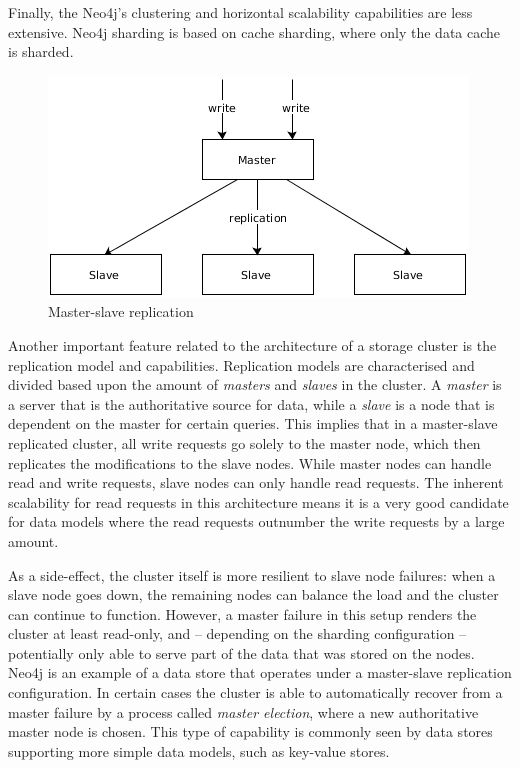 Finally, the Neo4j's clustering and horizontal scalability capabilities are less extensive.
Neo4j sharding is based on cache sharding, where only the data cache is sharded.

\begin{figure}
  \centering
  \includegraphics[width=.6\textwidth]{img/replication-master-slave.png}
  \caption{Master-slave replication}
  \label{fig:replication-master-slave}
\end{figure}

Another important feature related to the architecture of a storage cluster is the replication model and capabilities.
Replication models are characterised and divided based upon the amount of \textit{masters} and \textit{slaves} in the cluster.
A \textit{master} is a server that is the authoritative source for data, while a \textit{slave} is a node that is dependent on the master for certain queries.
This implies that in a master-slave replicated cluster, all write requests go solely to the master node, which then replicates the modifications to the slave nodes.
While master nodes can handle read and write requests, slave nodes can only handle read requests.
The inherent scalability for read requests in this architecture means it is a very good candidate for data models where the read requests outnumber the write requests by a large amount.

As a side-effect, the cluster itself is more resilient to slave node failures: when a slave node goes down, the remaining nodes can balance the load and the cluster can continue to function.
However, a master failure in this setup renders the cluster at least read-only, and -- depending on the sharding configuration -- potentially only able to serve part of the data that was stored on the nodes.
Neo4j is an example of a data store that operates under a master-slave replication configuration.
In certain cases the cluster is able to automatically recover from a master failure by a process called \textit{master election}, where a new authoritative master node is chosen.
This type of capability is commonly seen by data stores supporting more simple data models, such as key-value stores.

